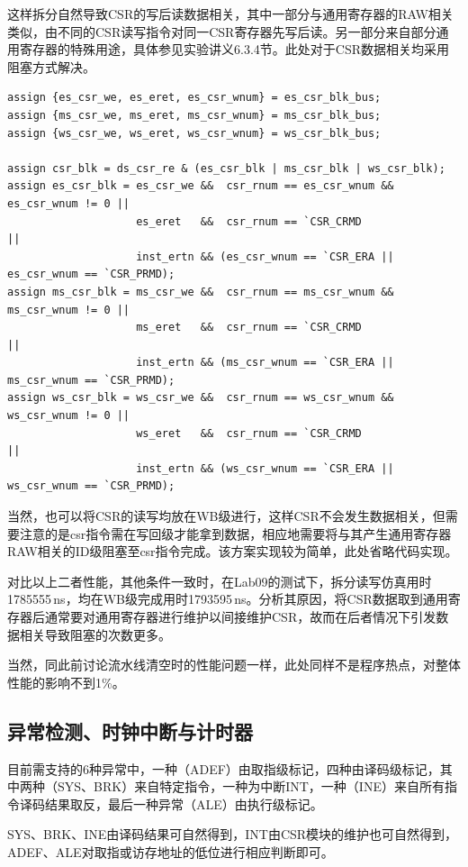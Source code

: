 \documentclass[UTF-8,twoside,cs4size]{ctexart}
\begin{document}
    这样拆分自然导致CSR的写后读数据相关，其中一部分与通用寄存器的RAW相关类似，由不同的CSR读写指令对同一CSR寄存器先写后读。另一部分来自部分通用寄存器的特殊用途，具体参见实验讲义6.3.4节。此处对于CSR数据相关均采用阻塞方式解决。
    \begin{verbatim}
assign {es_csr_we, es_eret, es_csr_wnum} = es_csr_blk_bus;
assign {ms_csr_we, ms_eret, ms_csr_wnum} = ms_csr_blk_bus;
assign {ws_csr_we, ws_eret, ws_csr_wnum} = ws_csr_blk_bus;

assign csr_blk = ds_csr_re & (es_csr_blk | ms_csr_blk | ws_csr_blk);
assign es_csr_blk = es_csr_we &&  csr_rnum == es_csr_wnum && es_csr_wnum != 0 ||
                    es_eret   &&  csr_rnum == `CSR_CRMD                       ||
                    inst_ertn && (es_csr_wnum == `CSR_ERA || es_csr_wnum == `CSR_PRMD);
assign ms_csr_blk = ms_csr_we &&  csr_rnum == ms_csr_wnum && ms_csr_wnum != 0 ||
                    ms_eret   &&  csr_rnum == `CSR_CRMD                       ||
                    inst_ertn && (ms_csr_wnum == `CSR_ERA || ms_csr_wnum == `CSR_PRMD);
assign ws_csr_blk = ws_csr_we &&  csr_rnum == ws_csr_wnum && ws_csr_wnum != 0 ||
                    ws_eret   &&  csr_rnum == `CSR_CRMD                       ||
                    inst_ertn && (ws_csr_wnum == `CSR_ERA || ws_csr_wnum == `CSR_PRMD);
    \end{verbatim}
    
    当然，也可以将CSR的读写均放在WB级进行，这样CSR不会发生数据相关，但需要注意的是csr指令需在写回级才能拿到数据，相应地需要将与其产生通用寄存器RAW相关的ID级阻塞至csr指令完成。该方案实现较为简单，此处省略代码实现。
    
    对比以上二者性能，其他条件一致时，在Lab09的测试下，拆分读写仿真用时1785555\,ns，均在WB级完成用时1793595\,ns。分析其原因，将CSR数据取到通用寄存器后通常要对通用寄存器进行维护以间接维护CSR，故而在后者情况下引发数据相关导致阻塞的次数更多。
    
    当然，同此前讨论流水线清空时的性能问题一样，此处同样不是程序热点，对整体性能的影响不到1\%。
    
    \subsection{异常检测、时钟中断与计时器}
    目前需支持的6种异常中，一种（ADEF）由取指级标记，四种由译码级标记，其中两种（SYS、BRK）来自特定指令，一种为中断INT，一种（INE）来自所有指令译码结果取反，最后一种异常（ALE）由执行级标记。
    
    SYS、BRK、INE由译码结果可自然得到，INT由CSR模块的维护也可自然得到，ADEF、ALE对取指或访存地址的低位进行相应判断即可。
    
\end{document}
